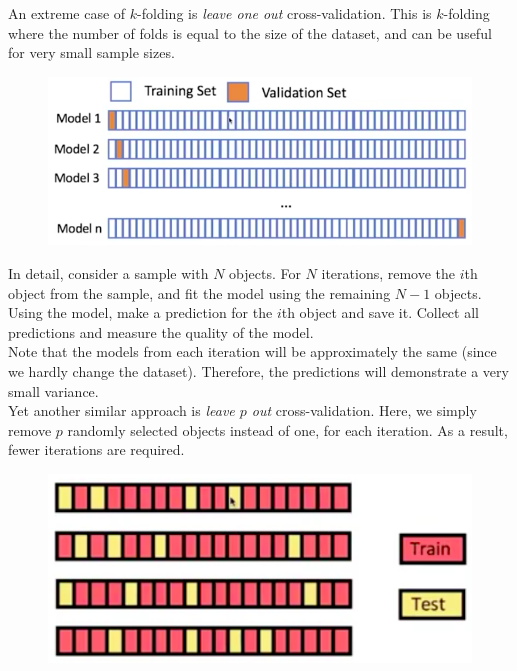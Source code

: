 An extreme case of $k$-folding is \textit{leave one out} cross-validation. This is $k$-folding where the number of folds is equal to the size of the dataset, and can be useful for very small sample sizes.
\begin{figure}[H]
\centering
\includegraphics[scale=0.3]{leaveoneout.png}
\end{figure}
In detail, consider a sample with $N$ objects. For $N$ iterations, remove the $i$th object from the sample, and fit the model using the remaining $N-1$ objects. Using the model, make a prediction for the $i$th object and save it. Collect all predictions and measure the quality of the model.\\

Note that the models from each iteration will be approximately the same (since we hardly change the dataset). Therefore, the predictions will demonstrate a very small variance. \\

Yet another similar approach is \textit{leave $p$ out} cross-validation. Here, we simply remove $p$ randomly selected objects instead of one, for each iteration. As a result, fewer iterations are required.

\begin{figure}[H]
\centering
\includegraphics[scale=0.3]{leavepout.png}
\end{figure}


\minirule

